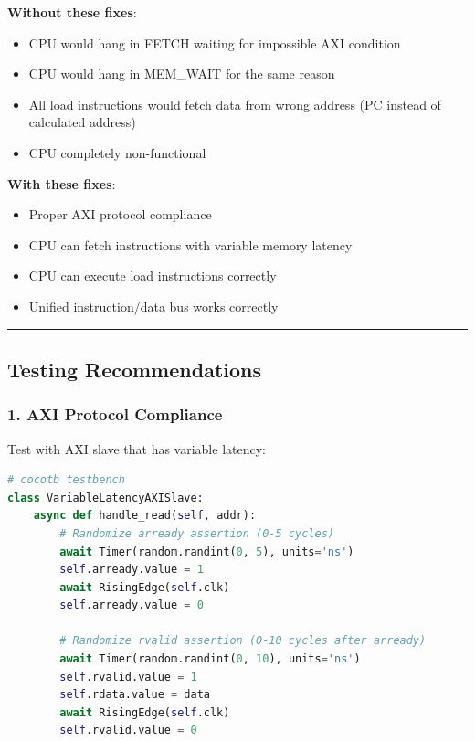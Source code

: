 \begin{record}

\textbf{Without these fixes}:

\begin{itemize}
\tightlist
\item
  \bad{} CPU would hang in FETCH waiting for impossible AXI condition
\item
  \bad{} CPU would hang in MEM\_WAIT for the same reason
\item
  \bad{} All load instructions would fetch data from wrong address (PC
  instead of calculated address)
\item
  \bad{} CPU completely non-functional
\end{itemize}

\textbf{With these fixes}:

\begin{itemize}
\tightlist
\item
  \ok{} Proper AXI protocol compliance
\item
  \ok{} CPU can fetch instructions with variable memory latency
\item
  \ok{} CPU can execute load instructions correctly
\item
  \ok{} Unified instruction/\allowbreak{}data bus works correctly
\end{itemize}

\begin{center}\rule{0.5\linewidth}{0.5pt}\end{center}

\end{record}

\subsection{Testing Recommendations}\label{cr:fix:critical-fixes:testing-recommendations}

\subsubsection{1. AXI Protocol Compliance}\label{cr:fix:critical-fixes:1-axi-protocol-compliance}

\begin{record}

Test with AXI slave that has variable latency:

\begin{lstlisting}[language=Python]
# cocotb testbench
class VariableLatencyAXISlave:
    async def handle_read(self, addr):
        # Randomize arready assertion (0-5 cycles)
        await Timer(random.randint(0, 5), units='ns')
        self.arready.value = 1
        await RisingEdge(self.clk)
        self.arready.value = 0

        # Randomize rvalid assertion (0-10 cycles after arready)
        await Timer(random.randint(0, 10), units='ns')
        self.rvalid.value = 1
        self.rdata.value = data
        await RisingEdge(self.clk)
        self.rvalid.value = 0
\end{lstlisting}

\end{record}

